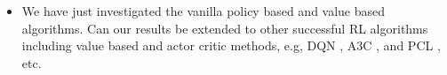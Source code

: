 \begin{itemize}
    \item We have just investigated the vanilla policy based and value based algorithms. Can our results be extended to other successful RL algorithms including value based and actor critic methods, e.g, DQN \cite{mnih2015human}, A3C \citep{mnih2016asynchronous}, and PCL \citep{nachum2017bridging}, etc.
\end{itemize}

\nocite{langley00}
\fi